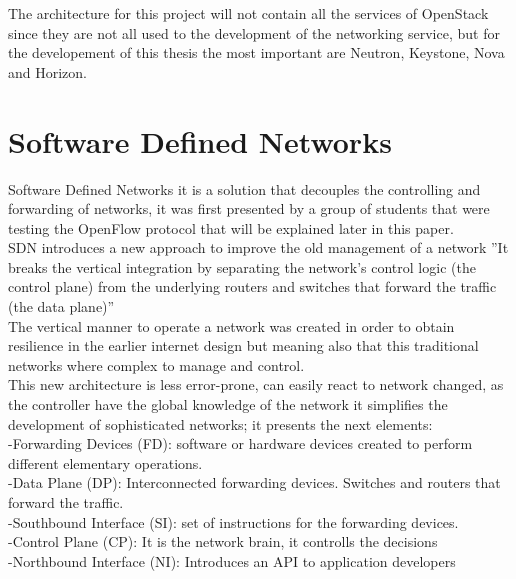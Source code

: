 The architecture for this project will not contain all the services of OpenStack since they are not all used to the development of the networking service, but for the developement of this thesis the most important are Neutron, Keystone, Nova and Horizon.\\
 
 
\section{Software Defined Networks}
 
Software Defined Networks it is a solution that decouples the controlling and forwarding of networks, it was first presented by a group of students that were testing the OpenFlow protocol that will be explained later in this paper.\\
 
SDN introduces a new approach to improve the old management of a network ”It breaks the vertical integration by separating the network’s control logic (the control plane) from the underlying routers and switches that forward the traffic (the data plane)”\cite{1}\\
 
The vertical manner to operate a network was created in order to obtain resilience in the earlier internet design but meaning also that this traditional networks where complex to manage and control.\\
 
This new architecture is less error-prone, can easily react to network changed, as the controller have the global knowledge of the network it simplifies the
development of sophisticated networks; it presents the next elements:\\
 
-Forwarding Devices (FD): software or hardware devices created to perform different elementary operations.\\
 
-Data Plane (DP): Interconnected forwarding devices. Switches and routers that forward the traffic.\\

-Southbound Interface (SI): set of instructions for the forwarding devices.\\
 
-Control Plane (CP): It is the network brain, it controlls the decisions\\
 
-Northbound Interface (NI): Introduces an API to application developers\\
 
